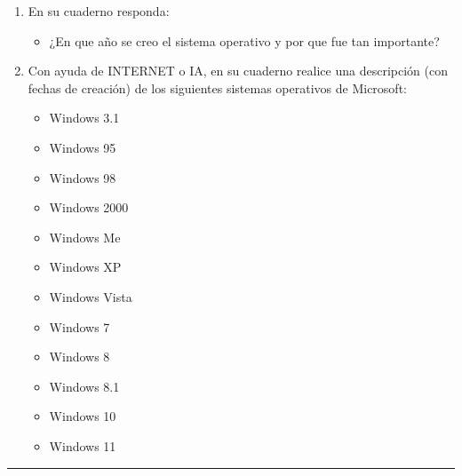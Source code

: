 \documentclass[letterpaper,10pt,spanish]{sphinxmanual}
\begin{document}
\begin{enumerate}
\item {} 
\sphinxAtStartPar
En su cuaderno responda:
\begin{itemize}
\item {} 
\sphinxAtStartPar
¿En que año se creo el sistema operativo  y por que fue tan importante?

\end{itemize}

\item {} 
\sphinxAtStartPar
Con ayuda de INTERNET o IA, en su cuaderno realice una descripción (con fechas de creación) de los siguientes sistemas operativos de Microsoft:
\begin{itemize}
\item {} 
\sphinxAtStartPar
Windows 3.1

\item {} 
\sphinxAtStartPar
Windows 95

\item {} 
\sphinxAtStartPar
Windows 98

\item {} 
\sphinxAtStartPar
Windows 2000

\item {} 
\sphinxAtStartPar
Windows Me

\item {} 
\sphinxAtStartPar
Windows XP

\item {} 
\sphinxAtStartPar
Windows Vista

\item {} 
\sphinxAtStartPar
Windows 7

\item {} 
\sphinxAtStartPar
Windows 8

\item {} 
\sphinxAtStartPar
Windows 8.1

\item {} 
\sphinxAtStartPar
Windows 10

\item {} 
\sphinxAtStartPar
Windows 11

\end{itemize}

\end{enumerate}


\bigskip\hrule\bigskip
\end{document}
